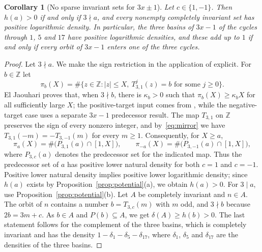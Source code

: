 \documentclass[12pt]{amsart}
\newtheorem{corollary}{Corollary}
\theoremstyle{definition}
\theoremstyle{remark}
\begin{document}
\begin{corollary}[No sparse invariant sets for $3x\pm1$]
\label{cor:dichotomy}
Let $c\in\{1,-1\}$. Then $h(a)>0$ if and only if $3\nmid a$, and every nonempty completely invariant set has positive logarithmic density. In particular, the three basins of $3x-1$ of the cycles through $1$, $5$ and $17$ have positive logarithmic densities, and these add up to $1$ if and only if every orbit of $3x-1$ enters one of the three cycles.
\end{corollary}

\begin{proof}
Let $3\nmid a$. We make the sign restriction in the application of \cite[Theorem~A]{ElJaouhari_2026} explicit. For $b\in\mathbb Z$ let
\[
 \pi_b(X)=\#\{z\in\mathbb Z:|z|\le X,\ T_{3,1}^j(z)=b\text{ for some }j\ge0\}.
\]
El Jaouhari proves that, when $3\nmid b$, there is $\kappa_b>0$ such that $\pi_b(X)\ge\kappa_b X$ for all sufficiently large $X$; the positive-target input comes from \cite{Mazur_Pred_2026}, while the negative-target case uses a separate $3x-1$ predecessor result. The map $T_{3,1}$ on $\mathbb Z$ preserves the sign of every nonzero integer, and by~\eqref{eq:mirror} we have $T_{3,1}(-m)=-T_{3,-1}(m)$ for every $m\ge1$. Consequently, for $X\ge a$,
\[
 \pi_a(X)=\#\bigl(P_{3,1}(a)\cap[1,X]\bigr),\qquad
 \pi_{-a}(X)=\#\bigl(P_{3,-1}(a)\cap[1,X]\bigr),
\]
where $P_{3,c}(a)$ denotes the predecessor set for the indicated map. Thus the predecessor set of $a$ has positive lower natural density for both $c=1$ and $c=-1$. Positive lower natural density implies positive lower logarithmic density; since $h(a)$ exists by Proposition~\ref{prop:potential}(a), we obtain $h(a)>0$. For $3\mid a$, use Proposition~\ref{prop:potential}(b). Let $A$ be completely invariant and $n\in A$. The orbit of $n$ contains a number $b=T_{3,c}(m)$ with $m$ odd, and $3\nmid b$ because $2b=3m+c$. As $b\in A$ and $P(b)\subseteq A$, we get $\delta(A)\ge h(b)>0$. The last statement follows for the complement of the three basins, which is completely invariant and has the density $1-\delta_1-\delta_5-\delta_{17}$, where $\delta_1$, $\delta_5$ and $\delta_{17}$ are the densities of the three basins.
\end{proof}
\end{document}

